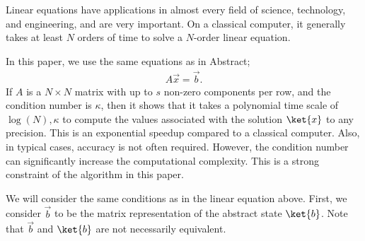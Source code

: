 \documentclass[b5paper,papersize,dvipdfmx,fleqn]{jsarticle}
\begin{document}

Linear equations have applications in almost every field of science, technology, and engineering, and are very important\cite{Harrow2009}. On a classical computer, it generally takes at least $N$ orders of time to solve a $N$-order linear equation.


In this paper, we use the same equations as in Abstract;
\begin{eqnarray}
  A\vec{x} = \vec{b}.
\end{eqnarray}
If $A$ is a $N\times N$ matrix with up to $s$ non-zero components per row, and the condition number is $\kappa $, then it shows that it takes a polynomial time scale of $\log(N),\kappa $ to compute the values associated with the solution $\ket{x}$ to any precision. This is an exponential speedup compared to a classical computer. Also, in typical cases, accuracy is not often required. However, the condition number can significantly increase the computational complexity. This is a strong constraint of the algorithm in this paper.

We will consider the same conditions as in the linear equation above. First, we consider $\vec{b}$ to be the matrix representation of the abstract state $\ket{b}$. Note that $\vec{b}$ and $\ket{b}$ are not necessarily equivalent.

%

\end{document}
